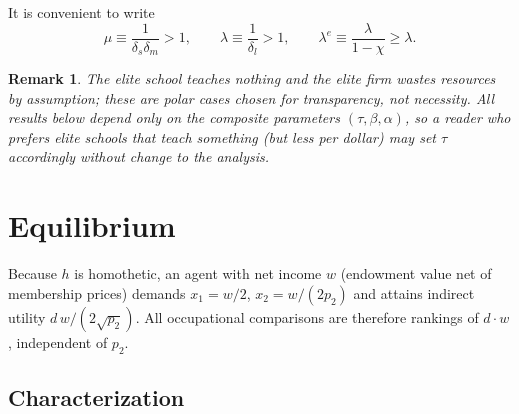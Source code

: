 \documentclass[12pt,letterpaper]{article}
\newtheorem{remark}{Remark}
\theoremstyle{definition}
\begin{document}
It is convenient to write \[ \mu \equiv \frac{1}{\delta_s\delta_m}>1, \qquad \lambda \equiv \frac{1}{\delta_l}>1, \qquad \lambda^{e} \equiv \frac{\lambda}{1-\chi}\geq\lambda .
\]

\begin{remark}\label{rem:polar} The elite school teaches nothing and the elite firm wastes resources by assumption; these are polar cases chosen for transparency, not necessity.
All results below depend only on the composite parameters $(\tau,\beta,\alpha)$, so a reader who prefers elite schools that teach something (but less per dollar) may set $\tau$ accordingly without change to the analysis.
\end{remark}

\section{Equilibrium}\label{sec:equilibrium}

Because $h$ is homothetic, an agent with net income $w$ (endowment value net of membership prices) demands $x_1=w/2$, $x_2=w/(2p_2)$ and attains indirect utility $d\, w/(2\sqrt{p_2})$.
All occupational comparisons are therefore rankings of $d\cdot w$, independent of $p_2$.

\subsection{Characterization}
\end{document}
